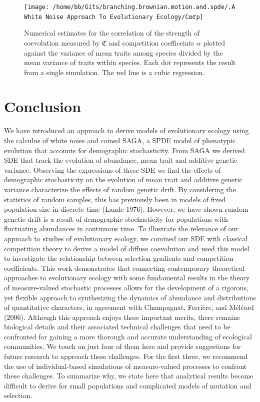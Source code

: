 \documentclass[]{article}
\begin{document}
\begin{figure}

{\centering \texttt{[image: /home/bb/Gits/branching.brownian.motion.and.spde/.A White Noise Approach To Evolutionary Ecology/Cαℭp]} 

}

\caption{\label{cor_coev_fig}Numerical estimates for the correlation of the strength of coevolution measured by $\mathfrak{C}$ and competition coefficeints $\alpha$ plotted against the variance of mean traits among species divided by the mean variance of traits within species. Each dot represents the result from a single simulation. The red line is a cubic regression.}\label{fig:unnamed-chunk-12}
\end{figure}

\hypertarget{conclusion}{%
\section{\texorpdfstring{Conclusion
\label{conclusion}}{Conclusion }}\label{conclusion}}

We have introduced an approach to derive models of evolutionary ecology
using the calculus of white noise and coined SAGA, a SPDE model of
phenotypic evolution that accounts for demographic stochasticity. From
SAGA we derived SDE that track the evolution of abundance, mean trait
and additive genetic variance. Observing the expressions of these SDE we
find the effects of demographic stochasticity on the evolution of mean
trait and additive genetic variance characterize the effects of random
genetic drift. By considering the statistics of random samples, this has
previously been in models of fixed population size in discrete time
(Lande 1976). However, we have shown random genetic drift is a result of
demographic stochasticity for populations with fluctuating abundances in
continuous time. To illustrate the relevance of our approach to studies
of evolutionary ecology, we comined our SDE with classical competition
theory to derive a model of diffuse coevolution and used this model to
investigate the relationship between selection gradients and competition
coefficients. This work demonstrates that connecting contemporary
theoretical approaches to evolutionary ecology with some fundamental
results in the theory of measure-valued stochastic processes allows for
the development of a rigorous, yet flexible approach to synthesizing the
dynamics of abundance and distributions of quantitative characters, in
agreement with Champagnat, Ferrière, and Méléard (2006). Although this
approach enjoys these important merits, there remains biological details
and their associated technical challenges that need to be confronted for
gaining a more thorough and accurate understanding of ecological
communities. We touch on just four of them here and provide suggestions
for future research to approach these challenges. For the first three,
we recommend the use of individual-based simulations of measure-valued
processes to confront these challenges. To summarize why, we state here
that analytical results become difficult to derive for small populations
and complicated models of mutation and selection.
\end{document}
